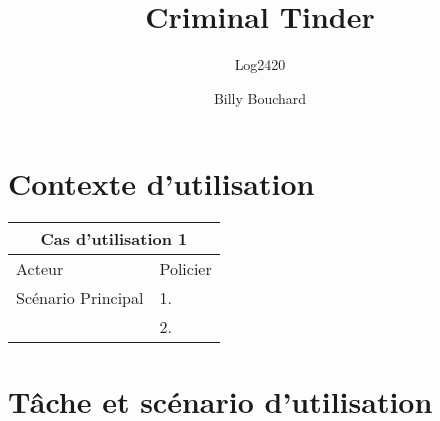 \documentclass[12pt]{article}
\title{Criminal Tinder}
\subtitle{Log2420}
\author{Billy Bouchard}{Jacob Dorais}{Thien Nguyen}{Pascal Chayer}{François-Xavier Legault}
\begin{document}
\maketitle
\section{Contexte d'utilisation}
\begin{tabular}{| l | l |}
 \hline
 \multicolumn{2}{|c|}{Cas d'utilisation 1} \\ \hline
 Acteur              & Policier \\ \hline
 Scénario Principal & 1.       \\
                     & 2.       \\ \hline
\end{tabular}
\section{Tâche et scénario d'utilisation}
\end{document}
